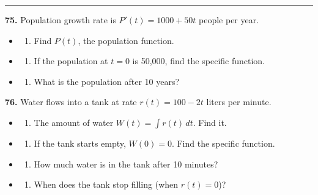 \documentclass[
  11pt,
]{article}
\providecommand{\tightlist}{%
  \setlength{\itemsep}{0pt}\setlength{\parskip}{0pt}}
\begin{document}
\begin{center}\rule{0.5\linewidth}{0.5pt}\end{center}

\textbf{75.} Population growth rate is \(P'(t) = 1000 + 50t\) people per
year.

\begin{itemize}
\item
  \begin{enumerate}
  \def\labelenumi{(\alph{enumi})}
  \tightlist
  \item
    Find \(P(t)\), the population function.
  \end{enumerate}
\item
  \begin{enumerate}
  \def\labelenumi{(\alph{enumi})}
  \setcounter{enumi}{1}
  \tightlist
  \item
    If the population at \(t = 0\) is 50,000, find the specific
    function.
  \end{enumerate}
\item
  \begin{enumerate}
  \def\labelenumi{(\alph{enumi})}
  \setcounter{enumi}{2}
  \tightlist
  \item
    What is the population after 10 years?
  \end{enumerate}
\end{itemize}

\textbf{76.} Water flows into a tank at rate \(r(t) = 100 - 2t\) liters
per minute.

\begin{itemize}
\item
  \begin{enumerate}
  \def\labelenumi{(\alph{enumi})}
  \tightlist
  \item
    The amount of water \(W(t) = \int r(t) \, dt\). Find it.
  \end{enumerate}
\item
  \begin{enumerate}
  \def\labelenumi{(\alph{enumi})}
  \setcounter{enumi}{1}
  \tightlist
  \item
    If the tank starts empty, \(W(0) = 0\). Find the specific function.
  \end{enumerate}
\item
  \begin{enumerate}
  \def\labelenumi{(\alph{enumi})}
  \setcounter{enumi}{2}
  \tightlist
  \item
    How much water is in the tank after 10 minutes?
  \end{enumerate}
\item
  \begin{enumerate}
  \def\labelenumi{(\alph{enumi})}
  \setcounter{enumi}{3}
  \tightlist
  \item
    When does the tank stop filling (when \(r(t) = 0\))?
  \end{enumerate}
\end{itemize}
\end{document}
